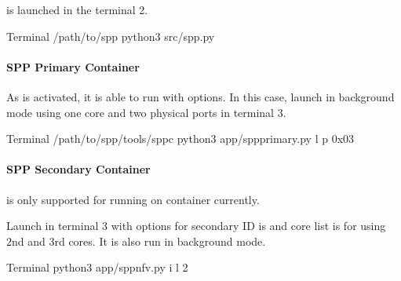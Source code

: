 \documentclass[a4paper,11pt,openany,oneside,english]{sphinxmanual}
\begin{document}
 is launched in the terminal 2.

\begin{sphinxVerbatim}[commandchars=\\\{\},formatcom=\footnotesize]
 Terminal 
  /path/to/spp
 python3 src/spp.py
\end{sphinxVerbatim}


\paragraph{SPP Primary Container}
\label{\detokenize{tools/sppc/getting_started:spp-primary-container}}
As  is activated, it is able to run 
with options. In this case, launch  in background mode using
one core and two physical ports in terminal 3.

\begin{sphinxVerbatim}[commandchars=\\\{\},formatcom=\footnotesize]
 Terminal 
  /path/to/spp/tools/sppc
 python3 app/spp\PYGZhy{}primary.py \PYGZhy{}l  \PYGZhy{}p 0x03
\end{sphinxVerbatim}


\paragraph{SPP Secondary Container}
\label{\detokenize{tools/sppc/getting_started:spp-secondary-container}}
 is only supported for running on container currently.

Launch  in terminal 3 with options for secondary ID is
 and core list is  for using 2nd and 3rd cores.
It is also run in background mode.

\begin{sphinxVerbatim}[commandchars=\\\{\},formatcom=\footnotesize]
 Terminal 
 python3 app/spp\PYGZhy{}nfv.py \PYGZhy{}i  \PYGZhy{}l \PYGZhy{}2
\end{sphinxVerbatim}
\end{document}
